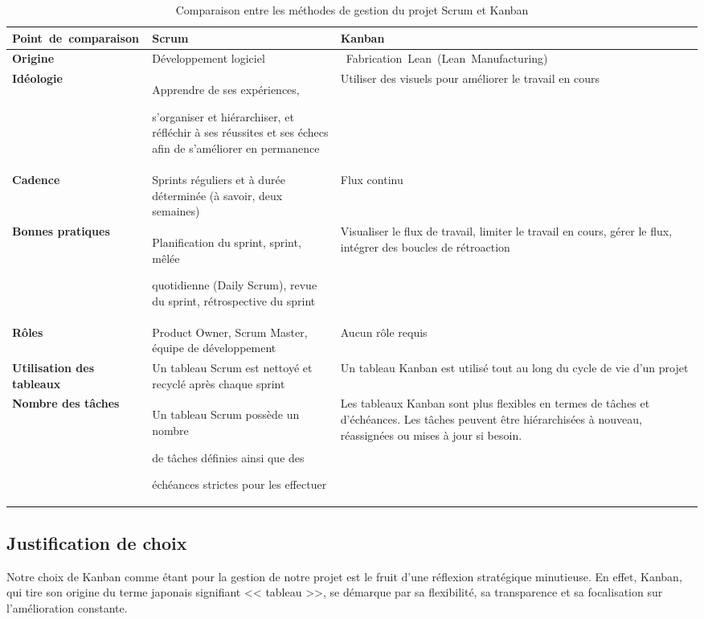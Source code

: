 \begin{table}[H]
    \centering
    \begin{tabular}{|p{3.5cm}|p{6cm}|p{6cm}|}
        \hline
        \rowcolor{blue!18}\textbf{\hbox{Point de comparaison}} & \textbf{Scrum} & \textbf{Kanban} \\
        \hline
        \textbf{Origine} & Développement logiciel & \hbox{ Fabrication Lean (Lean Manufacturing)} \\
        \hline
        \textbf{Idéologie} & Apprendre de ses expériences,\par s'organiser et hiérarchiser, et réfléchir à ses réussites et ses échecs afin de s'améliorer en permanence & Utiliser des visuels pour améliorer le travail en cours \\
        \hline
        \textbf{Cadence} & Sprints réguliers et à durée déterminée (à savoir, deux semaines) & Flux continu \\
        \hline
        \textbf{Bonnes pratiques }& Planification du sprint, sprint, mêlée \par quotidienne (Daily Scrum), revue du sprint, rétrospective du sprint & Visualiser le flux de travail, limiter le travail en cours, gérer le flux, intégrer des boucles de rétroaction \\
        \hline
        \textbf{Rôles }& Product Owner, Scrum Master, équipe de développement & Aucun rôle requis \\
        \hline
        \textbf{Utilisation des tableaux} & Un tableau Scrum est nettoyé et recyclé après chaque sprint & Un tableau Kanban est utilisé tout au long du cycle de vie d'un projet \\
        \hline
        \textbf{Nombre des tâches }& Un tableau Scrum possède un nombre \par de tâches définies ainsi que des\par échéances strictes pour les effectuer&
        Les tableaux Kanban sont plus flexibles en termes de tâches et d'échéances. Les tâches peuvent être hiérarchisées à nouveau, réassignées ou mises à jour si besoin. \\
        \hline
       
    \end{tabular}
    \label{tab:difference}
\caption{Comparaison entre les méthodes de gestion du projet Scrum et Kanban }
\end{table}

\subsection{Justification de choix}
\par Notre choix de Kanban comme étant pour la gestion de notre projet est le fruit d'une réflexion stratégique minutieuse. 
En effet, Kanban, qui tire son origine du terme japonais signifiant << tableau >>\cite{origine}, se démarque par sa flexibilité, sa transparence et sa focalisation sur l'amélioration constante.

